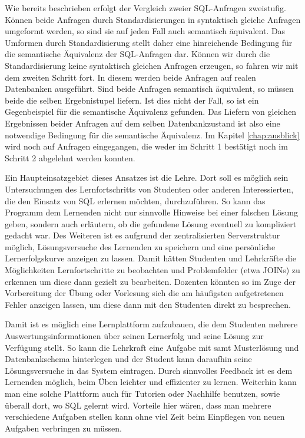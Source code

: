 Wie bereits beschrieben erfolgt der Vergleich zweier SQL-Anfragen zweistufig. Können beide Anfragen durch Standardisierungen in syntaktisch gleiche Anfragen umgeformt werden, so sind sie auf jeden Fall auch semantisch äquivalent. Das Umformen durch Standardisierung stellt daher eine hinreichende Bedingung für die semantische Äquivalenz der SQL-Anfragen dar. Können wir durch die Standardisierung keine syntaktisch gleichen Anfragen erzeugen, so fahren wir mit dem zweiten Schritt fort. In diesem werden beide Anfragen auf realen Datenbanken ausgeführt. Sind beide Anfragen semantisch äquivalent, so müssen beide die selben Ergebnistupel liefern. Ist dies nicht der Fall, so ist ein Gegenbeispiel für die semantische Äquivalenz gefunden. Das Liefern von gleichen Ergebnissen beider Anfragen auf dem selben Datenbankzustand ist also eine notwendige Bedingung für die semantische Äquivalenz. Im Kapitel \ref{chap:ausblick} wird noch auf Anfragen eingegangen, die weder im Schritt 1 bestätigt noch im Schritt 2 abgelehnt werden konnten. 


Ein Haupteinsatzgebiet dieses Ansatzes ist die Lehre. Dort soll es möglich sein Untersuchungen des Lernfortschritts von Studenten oder anderen Interessierten, die den Einsatz von SQL erlernen möchten, durchzuführen. So kann das Programm dem Lernenden nicht nur sinnvolle Hinweise bei einer falschen Lösung geben, sondern auch erläutern, ob die gefundene Lösung eventuell zu kompliziert gedacht war. Des Weiteren ist es aufgrund der zentralisierten Serverstruktur möglich, Lösungsversuche des Lernenden zu speichern und eine persönliche Lernerfolgskurve anzeigen zu lassen. Damit hätten Studenten und Lehrkräfte die Möglichkeiten Lernfortschritte zu beobachten und Problemfelder (etwa JOINs) zu erkennen um diese dann gezielt zu bearbeiten. Dozenten könnten so im Zuge der Vorbereitung der Übung oder Vorlesung sich die am häufigsten aufgetretenen Fehler anzeigen lassen, um diese dann mit den Studenten direkt zu besprechen.

Damit ist es möglich eine Lernplattform aufzubauen, die dem Studenten mehrere Auswertungsinformationen über seinen Lernerfolg und seine Lösung zur Verfügung stellt. So kann die Lehrkraft eine Aufgabe mit samt Musterlösung und Datenbankschema hinterlegen und der Student kann daraufhin seine Lösungsversuche in das System eintragen. Durch sinnvolles Feedback ist es dem Lernenden möglich, beim Üben leichter und effizienter zu lernen. Weiterhin kann man eine solche Plattform auch für Tutorien oder Nachhilfe benutzen, sowie überall dort, wo SQL gelernt wird. Vorteile hier wären, dass man mehrere verschiedene Aufgaben stellen kann ohne viel Zeit beim Einpflegen von neuen Aufgaben verbringen zu müssen.

